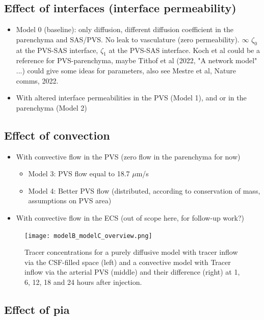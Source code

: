 \subsection*{Effect of interfaces (interface permeability)}

\begin{itemize}
    \item Model 0 (baseline): only diffusion, different diffusion coefficient in the parenchyma and SAS/PVS. No leak to vasculature (zero permeability). $\infty$ $\zeta_0$ at the PVS-SAS interface, $\zeta_1$ at the PVS-SAS interface. Koch et al could be a reference for PVS-parenchyma, maybe Tithof et al (2022, "A network model" ...) could give some ideas for parameters, also see Mestre et al, Nature comms, 2022. 
    \item 
    With altered interface permeabilities in the PVS (Model 1), and or in the parenchyma (Model 2) 
    \end{itemize}


\subsection*{Effect of convection}
\begin{itemize}
    \item 
    With convective flow in the PVS (zero flow in the parenchyma for now)
    \begin{itemize}
        \item 
        Model 3: PVS flow equal to 18.7 $\mu$m/s
        \item 
        Model 4: Better PVS flow (distributed, according to conservation of mass, assumptions on PVS area)
    \end{itemize}    
    \item 
    With convective flow in the ECS (out of scope here, for follow-up work?)
\end{itemize}

\begin{figure}
    \centering
    \texttt{[image: modelB\_modelC\_overview.png]}
    \caption{Tracer concentrations for a purely diffusive model with tracer inflow via the CSF-filled space (left) and a convective model with Tracer inflow via the arterial PVS (middle) and their difference (right) at 1, 6, 12, 18 and 24 hours after injection.}
    \label{fig:2}
\end{figure}

\subsection*{Effect of pia}
  
